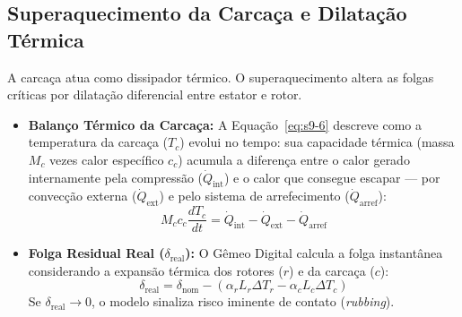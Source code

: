\documentclass[12pt,a4paper]{article}
\numberwithin{equation}{section}
\numberwithin{table}{section}
\numberwithin{figure}{section}
\begin{document}
	\subsection{\textbf{Superaquecimento da Carcaça e Dilatação Térmica}}
	A carcaça atua como dissipador térmico. O superaquecimento altera as folgas críticas por dilatação diferencial entre estator e rotor.
	\begin{itemize}
		\item \textbf{Balanço Térmico da Carcaça:} A Equação~\eqref{eq:s9-6} descreve como a temperatura da carcaça ($T_c$) evolui no tempo: sua capacidade térmica (massa $M_c$ vezes calor específico $c_c$) acumula a diferença entre o calor gerado internamente pela compressão ($\dot{Q}_{\text{int}}$) e o calor que consegue escapar — por convecção externa ($\dot{Q}_{\text{ext}}$) e pelo sistema de arrefecimento ($\dot{Q}_{\text{arref}}$):
		\begin{equation}\label{eq:s9-6}
 M_c c_c \frac{dT_c}{dt} = \dot{Q}_{\text{int}} - \dot{Q}_{\text{ext}} - \dot{Q}_{\text{arref}}
\end{equation}
		\item \textbf{Folga Residual Real ($\delta_{\text{real}}$):} O Gêmeo Digital calcula a folga instantânea considerando a expansão térmica dos rotores ($r$) e da carcaça ($c$):
		\begin{equation}\label{eq:s9-7}
 \delta_{\text{real}} = \delta_{\text{nom}} - (\alpha_r L_r \Delta T_r - \alpha_c L_c \Delta T_c) 
\end{equation}
		Se $\delta_{\text{real}} \to 0$, o modelo sinaliza risco iminente de contato (\textit{rubbing}).
	\end{itemize}
	
\end{document}
